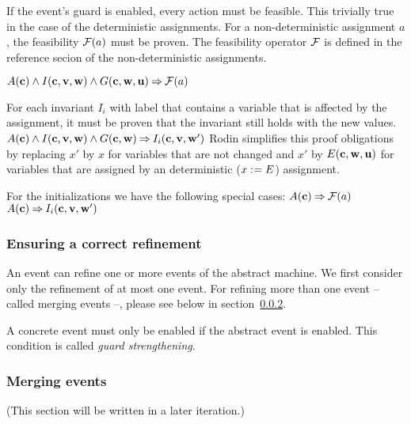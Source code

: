 If the event's guard is enabled, every action must be feasible.
  This trivially true in the case of the deterministic assignments.
  For a non-deterministic assignment $a$, the feasibility $\mathcal{F}(a)$ must be proven.
  The feasibility operator $\mathcal{F}$ is defined in the reference
  secion of the non-deterministic assignments.
  
  {$A(\mathbf{c}) \land I(\mathbf{c},{\mathbf{v},\mathbf{w}}) \land G(\mathbf{c},\mathbf{w},\mathbf{u}) \mathbin\Rightarrow \mathcal{F}(a)$}

For each invariant $I_i$ with label  
  that contains a variable that is affected by the assignment, it must be proven
  that the invariant still holds with the new values.
  {}%
  {$A(\mathbf{c}) \land I(\mathbf{c},{\mathbf{v},\mathbf{w}}) \land G(\mathbf{c},\mathbf{w}) \mathbin\Rightarrow I_i(\mathbf{c},{\mathbf{v},\mathbf{w}}')$}
  Rodin simplifies this proof obligations by replacing $x'$ by $x$ for variables that are not
  changed and $x'$ by $E(\mathbf{c},\mathbf{w},\mathbf{u})$ 
  for variables that are assigned by an deterministic ($x \mathrel{:\mkern1mu=} E$) assignment.

For the initializations we have the following special cases:
  {$A(\mathbf{c}) \mathbin\Rightarrow  \mathcal{F}(a)$}
  {}%
  {$A(\mathbf{c}) \mathbin\Rightarrow I_i(\mathbf{c},{\mathbf{v},\mathbf{w}}')$}

\subsubsection{Ensuring a correct refinement}
\label{refinement_proof_obligations}
An event can refine one or more events of the abstract machine.
We first consider only the refinement of at most one event. 
For refining more than one event -- called merging events --, please see below in section~\ref{merging_events}.


A concrete event must only be enabled if the abstract event is enabled.
This condition is called \emph{guard strengthening}.


\subsubsection{Merging events}
\label{merging_events}
(This section will be written in a later iteration.)

